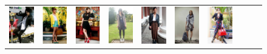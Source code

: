 \begin{figure}[H]
	\centering
	\setlength{\tabcolsep}{0.1pt}
	\setlength{\fboxsep}{0pt}%
	\setlength{\fboxrule}{0.1pt}%
	\renewcommand{\arraystretch}{0.6}
	\begin{tabular}{cccccccccc}
		\includegraphics[width=.1\textwidth]{./figures/dataset/0023328_b.jpg} & 
		\includegraphics[width=.1\textwidth]{./figures/dataset/0019351_b.jpg} &
		\includegraphics[width=.1\textwidth]{./figures/dataset/0019891_b.jpg} &
		\includegraphics[width=.1\textwidth]{./figures/dataset/0020171_b.jpg} &
		\includegraphics[width=.1\textwidth]{./figures/dataset/0020348_b.jpg} & 
		\includegraphics[width=.1\textwidth]{./figures/dataset/0020830_b.jpg} &
		\includegraphics[width=.1\textwidth]{./figures/dataset/0020879_b.jpg} &

\end{tabular}
\end{figure}
